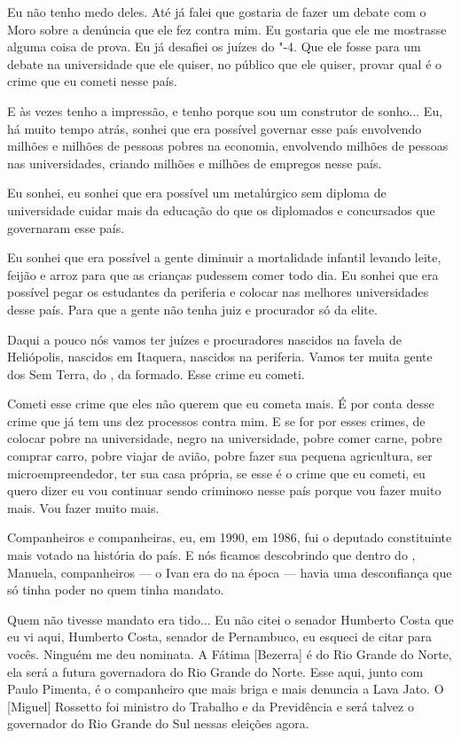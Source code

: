 Eu não tenho medo deles. Até já falei que gostaria de fazer um
debate com o Moro sobre a denúncia que ele fez contra mim. Eu gostaria
que ele me mostrasse alguma coisa de prova. Eu já desafiei os juízes do
"-4. Que ele fosse para um debate na universidade que ele quiser, no
público que ele quiser, provar qual é o crime que eu cometi nesse país.

E às vezes tenho a impressão, e tenho porque sou um construtor
de sonho... Eu, há muito tempo atrás, sonhei que era possível
governar esse país envolvendo milhões e milhões de pessoas pobres na
economia, envolvendo milhões de pessoas nas universidades, criando
milhões e milhões de empregos nesse país.

Eu sonhei, eu sonhei que era possível um metalúrgico sem diploma
de universidade cuidar mais da educação do que os diplomados e
concursados que governaram esse país.

Eu sonhei que era possível a gente diminuir a mortalidade infantil
levando leite, feijão e arroz para que as crianças pudessem comer todo
dia. Eu sonhei que era possível pegar os estudantes da periferia e
colocar nas melhores universidades desse país. Para que a gente não
tenha juiz e procurador só da elite.

Daqui a pouco nós vamos ter juízes e procuradores nascidos na
favela de Heliópolis, nascidos em Itaquera, nascidos na periferia. Vamos
ter muita gente dos Sem Terra, do , da  formado. Esse crime eu
cometi.

Cometi esse crime que eles não querem que eu cometa mais. É por
conta desse crime que já tem uns dez processos contra mim. E se for por
esses crimes, de colocar pobre na universidade, negro na universidade,
pobre comer carne, pobre comprar carro, pobre viajar de avião, pobre
fazer sua pequena agricultura, ser microempreendedor, ter sua casa
própria, se esse é o crime que eu cometi, eu quero dizer eu vou
continuar sendo criminoso nesse país porque vou fazer muito mais. Vou
fazer muito mais.

Companheiros e companheiras, eu, em 1990, em 1986, fui o
deputado constituinte mais votado na história do país. E nós ficamos
descobrindo que dentro do , Manuela, companheiros --- o Ivan era do  na
época --- havia uma desconfiança que só tinha poder no  quem tinha
mandato.

Quem não tivesse mandato era tido... Eu não citei o senador
Humberto Costa que eu vi aqui, Humberto Costa, senador de Pernambuco, eu
esqueci de citar para vocês. Ninguém me deu nominata. A Fátima
[Bezerra] é do Rio Grande do Norte, ela será a futura governadora do
Rio Grande do Norte. Esse aqui, junto com Paulo Pimenta, é o companheiro
que mais briga e mais denuncia a Lava Jato. O [Miguel] Rossetto foi
ministro do Trabalho e da Previdência e será talvez o governador do Rio
Grande do Sul nessas eleições agora.

